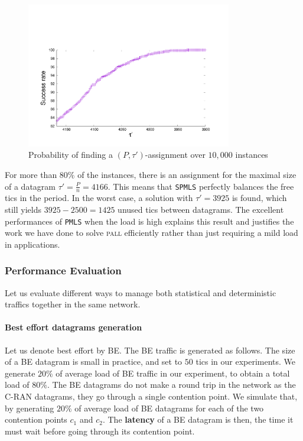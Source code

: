 \documentclass[a4paper,10pt]{article}
\newcommand\PMLS{\texttt{PMLS}\xspace}
\newcommand\SPMLS{\texttt{SPMLS}\xspace}
\newcommand\pall{\textsc{pall}\xspace}
\begin{document}
    \begin{figure}
       \begin{center}
      \includegraphics[width = 0.8\textwidth]{distribtau.pdf}
      \end{center}
      \caption{Probability of finding a $(P,\tau')$-assignment over $10,000$ instances}
      \label{fig:belatency}   
     \end{figure}   

	For more than $80\%$ of the instances, there is an assignment for the maximal size of a datagram $\tau' = \frac{P}{n} = 4166$. This means that \SPMLS perfectly balances the free tics in the period. In the worst case, a solution with $\tau' = 3925$ is found, which still yields $3925 - 2500 = 1425$ unused tics between datagrams. The excellent performances of \PMLS when the load is high explains this result and justifies the work we have done to solve \pall efficiently rather than just requiring a mild load in applications. 

    \subsubsection{Performance Evaluation}
    
    Let us evaluate different ways to manage both statistical and deterministic traffics together in the same network.
 
    \paragraph{Best effort datagrams generation}
    
    Let us denote best effort by BE. The BE traffic is generated as follows. The size of a BE datagram is small in practice, and set to $50$ tics in our experiments. We generate $20\%$ of average load of BE traffic in our experiment, to obtain a total load of $80\%$. The BE datagrams do not make a round trip
    in the network as the C-RAN datagrams, they go through a single contention point. 
    We simulate that, by generating $20\%$ of average load of BE datagrams for each of the two contention points $c_1$ and $c_2$. The \textbf{latency} of a BE datagram is then, the time it must wait before going
    through its contention point.
\end{document}
